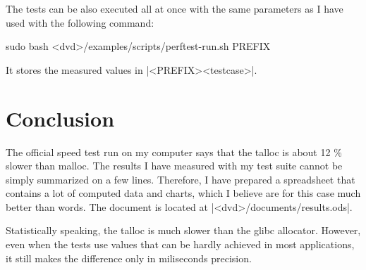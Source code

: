 \noindent
The tests can be also executed all at once with the same parameters as I
have used with the following command:
\begin{commandline}
sudo bash <dvd>/examples/scripts/perftest-run.sh PREFIX
\end{commandline}
\funclistend
It stores the measured values in |<PREFIX><testcase>|.

\section{Conclusion}

The official speed test run on my computer says that the talloc is about 12 \%
slower than malloc. The results I have measured with my test suite cannot be
simply summarized on a few lines. Therefore, I have prepared a spreadsheet that
contains a lot of computed data and charts, which I believe are for this
case much better than words. The document is located at
|<dvd>/documents/results.ods|.

Statistically speaking, the talloc is much slower than the glibc allocator.
However, even when the tests use values that can be hardly achieved in most
applications, it still makes the difference only in miliseconds precision.
 